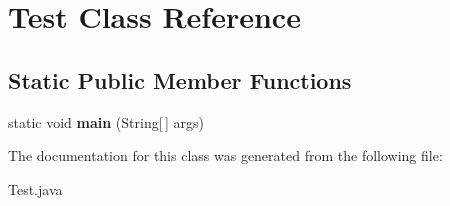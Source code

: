 \hypertarget{class_test}{}\section{Test Class Reference}
\label{class_test}
\subsection*{Static Public Member Functions}
\begin{DoxyCompactItemize}
\item 
static void {\bfseries main} (String\mbox{[}$\,$\mbox{]} args)\hypertarget{class_test_ad91b01698e99c4a022d21159dd694250}{}\label{class_test_ad91b01698e99c4a022d21159dd694250}

\end{DoxyCompactItemize}


The documentation for this class was generated from the following file\+:\begin{DoxyCompactItemize}
\item 
Test.\+java\end{DoxyCompactItemize}

